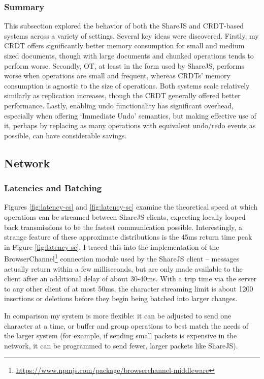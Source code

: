 \documentclass[12pt,a4paper,twoside,openright]{report}
\begin{document}
			\subsubsection{Summary}
				This subsection explored the behavior of both the ShareJS and CRDT-based systems across a variety of settings. Several key ideas were discovered. Firstly, my CRDT offers significantly better memory consumption for small and medium sized documents, though with large documents and chunked operations tends to perform worse. Secondly, OT, at least in the form used by ShareJS, performs worse when operations are small and frequent, whereas CRDTs' memory consumption is agnostic to the size of operations. Both systems scale relatively similarly as replication increases, though the CRDT generally offered better performance. Lastly, enabling undo functionality has significant overhead, especially when offering `Immediate Undo' semantics, but making effective use of it, perhaps by replacing as many operations with equivalent undo/redo events as possible, can have considerable savings.
					
		\subsection{Network}
			
		
			\subsubsection{Latencies and Batching}
			Figures \ref{fig:latency-cs} and \ref{fig:latency-sc} examine the theoretical speed at which operations can be streamed between ShareJS clients, expecting locally looped back transmissions to be the fastest communication possible. Interestingly, a strange feature of these approximate distributions is the 45ms return time peak in Figure \ref{fig:latency-sc}. I traced this into the implementation of the BrowserChannel\footnote{\url{https://www.npmjs.com/package/browserchannel-middleware}} connection module used by the ShareJS client -- messages actually return within a few milliseconds, but are only made available to the client after an additional delay of about 30-40ms. With a trip time via the server to any other client of at most 50ms, the character streaming limit is about 1200 insertions or deletions before they begin being batched into larger changes.
			
			In comparison my system is more flexible: it can be adjusted to send one character at a time, or buffer and group operations to best match the needs of the larger system (for example, if sending small packets is expensive in the network, it can be programmed to send fewer, larger packets like ShareJS).			
			
\end{document}
